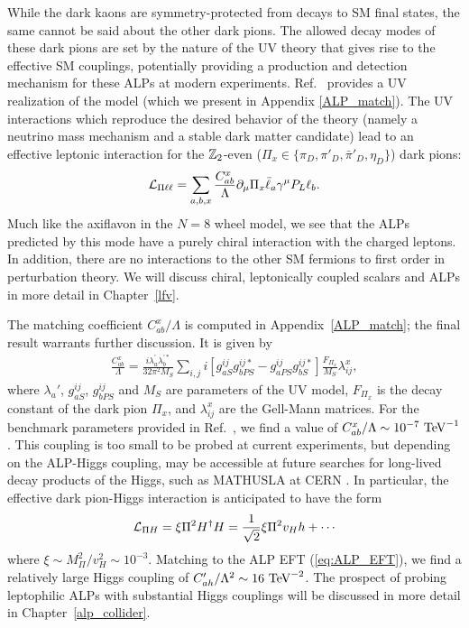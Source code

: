{While the dark kaons are symmetry-protected from decays to SM final states, the same cannot be said about the other dark pions. The allowed decay modes of these dark pions are set by the nature of the UV theory that gives rise to the effective SM couplings, potentially providing a production and detection mechanism for these ALPs at modern experiments. Ref.~\cite{Davoudiasl:2017zws} provides a UV realization of the model (which we present in Appendix \ref{ALP_match}). The UV interactions which reproduce the desired behavior of the theory (namely a neutrino mass mechanism and a stable dark matter candidate) lead to an effective leptonic interaction for the ${\Bbb Z}_2$-even ($\Pi_x \in \{\pi_D, \pi'_D, \bar{\pi}'_D, \eta_D\}$) dark pions:
\begin{align}
    {\cal L}_{\rm \Pi\ell\ell} = \sum_{a,b,x}\frac{C_{ab}^x}{\Lambda}\partial_\mu \Pi_x\bar{\ell}_a \gamma^\mu P_L\ell_b.\label{eq:dark_pion_int}
\end{align}
Much like the axiflavon in the $N=8$ wheel model, we see that the ALPs predicted by this mode have a purely chiral interaction with the charged leptons. In addition, there are no interactions to the other SM fermions to first order in perturbation theory.  We will discuss chiral, leptonically coupled scalars and ALPs in more detail in Chapter~\ref{lfv}.

The matching coefficient $C_{ab}^x/\Lambda$ is computed in Appendix~\ref{ALP_match}; the final result warrants further discussion. It is given by
\begin{align}
    \frac{C_{ab}^x}{\Lambda} = \frac{i\lambda_a^\prime\lambda_b^{\prime*}}{32\pi^2M_S}\sum_{i,j}i\left[g_{aS}^{ij}g_{bPS}^{ij*} - g_{aPS}^{ij}g_{bS}^{ij*}\right]\frac{F_{\Pi_x}}{M_S}\lambda_{ij}^x,
\end{align}
where $\lambda_a'$, $g_{aS}^{ij}$, $g_{bPS}^{ij}$ and $M_S$ are parameters of the UV model, $F_{\Pi_x}$ is the decay constant of the dark pion $\Pi_x$, and $\lambda_{ij}^x$ are the Gell-Mann matrices. For the benchmark parameters provided in Ref.~\cite{Davoudiasl:2017zws}, we find a value of $C_{ab}^x/\Lambda \sim 10^{-7}~{\rm TeV}^{-1}$. This coupling is too small to be probed at current experiments, but depending on the ALP-Higgs coupling, may be accessible at future searches for long-lived decay products of the Higgs, such as MATHUSLA at CERN \cite{MATHUSLA:2025eth}. In particular, the effective dark pion-Higgs interaction is anticipated to have the form
\begin{align}
    {\cal L}_{\Pi H} = \xi \Pi^2 H^\dagger H = \frac{1}{\sqrt{2}}\xi \Pi^2 v_H h + \cdots \label{eq:dark_pion_Higgs}
\end{align}
where $\xi \sim M_\Pi^2 / v_H^2 \sim 10^{-3}$. Matching to the ALP EFT (\ref{eq:ALP_EFT}), we find a relatively large Higgs coupling of $C_{ah}'/\Lambda^2 \sim 16~{\rm TeV}^{-2}$. The prospect of probing leptophilic ALPs with substantial Higgs couplings will be discussed in more detail in Chapter~\ref{alp_collider}.

}
